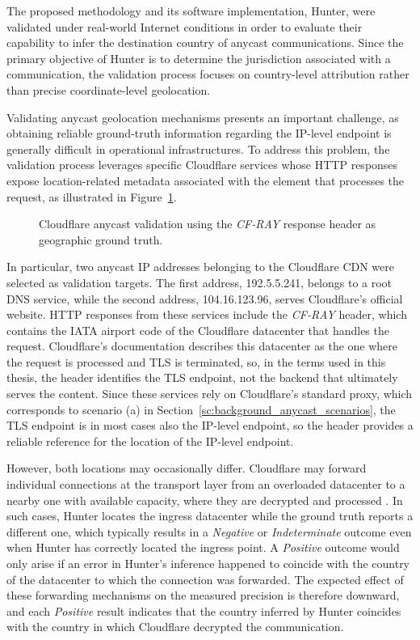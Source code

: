 The proposed methodology and its software implementation, Hunter, were validated under real-world Internet conditions in order to evaluate their capability to infer the destination country of anycast communications. Since the primary objective of Hunter is to determine the jurisdiction associated with a communication, the validation process focuses on country-level attribution rather than precise coordinate-level geolocation.

Validating anycast geolocation mechanisms presents an important challenge, as obtaining reliable ground-truth information regarding the IP-level endpoint is generally difficult in operational infrastructures. To address this problem, the validation process leverages specific Cloudflare services whose HTTP responses expose location-related metadata associated with the element that processes the request, as illustrated in Figure~\ref{fig:hunter_cloudflare_cf_ray}.

\begin{figure}[t]
    \centering
    \resizebox{\linewidth}{!}{%
        
    }
    \caption{Cloudflare anycast validation using the \textit{CF-RAY} response header as geographic ground truth.}
    \label{fig:hunter_cloudflare_cf_ray}
\end{figure}

In particular, two anycast IP addresses belonging to the Cloudflare CDN were selected as validation targets. The first address, 192.5.5.241, belongs to a root DNS service, while the second address, 104.16.123.96, serves Cloudflare's official website. HTTP responses from these services include the \textit{CF-RAY} header, which contains the IATA airport code of the Cloudflare datacenter that handles the request. Cloudflare's documentation describes this datacenter as the one where the request is processed and TLS is terminated, so, in the terms used in this thesis, the header identifies the TLS endpoint, not the backend that ultimately serves the content. Since these services rely on Cloudflare's standard proxy, which corresponds to scenario (a) in Section~\ref{sc:background_anycast_scenarios}, the TLS endpoint is in most cases also the IP-level endpoint, so the header provides a reliable reference for the location of the IP-level endpoint.

However, both locations may occasionally differ. Cloudflare may forward individual connections at the transport layer from an overloaded datacenter to a nearby one with available capacity, where they are decrypted and processed \cite{HowBlog}. In such cases, Hunter locates the ingress datacenter while the ground truth reports a different one, which typically results in a \textit{Negative} or \textit{Indeterminate} outcome even when Hunter has correctly located the ingress point. A \textit{Positive} outcome would only arise if an error in Hunter's inference happened to coincide with the country of the datacenter to which the connection was forwarded. The expected effect of these forwarding mechanisms on the measured precision is therefore downward, and each \textit{Positive} result indicates that the country inferred by Hunter coincides with the country in which Cloudflare decrypted the communication.

